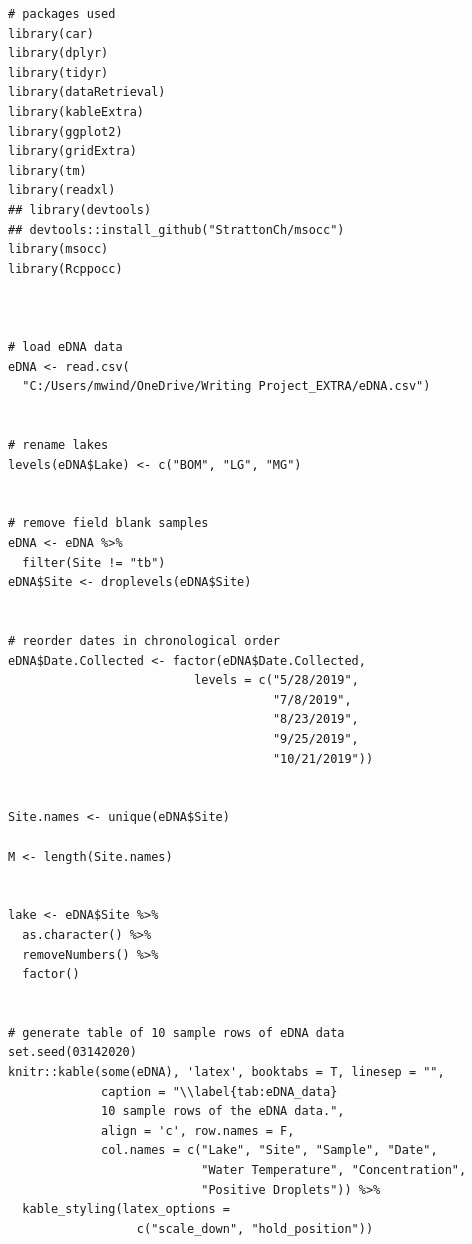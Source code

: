 \documentclass[12pt]{article}\usepackage[]{graphicx}\usepackage[]{color}
\makeatletter
\newenvironment{kframe}{%
 \def\at@end@of@kframe{}%
 \ifinner\ifhmode%
  \def\at@end@of@kframe{\end{minipage}}%
  \begin{minipage}{\columnwidth}%
 \fi\fi%
 \def\FrameCommand##1{\hskip\@totalleftmargin \hskip-\fboxsep
 \colorbox{shadecolor}{##1}\hskip-\fboxsep
     \hskip-\linewidth \hskip-\@totalleftmargin \hskip\columnwidth}%
 \MakeFramed {\advance\hsize-\width
   \@totalleftmargin\z@ \linewidth\hsize
   \@setminipage}}%
 {\par\unskip\endMakeFramed%
 \at@end@of@kframe}
\newenvironment{knitrout}{}{} %
\newenvironment{kframe}{%
 \def\at@end@of@kframe{}%
 \ifinner\ifhmode%
  \def\at@end@of@kframe{\end{minipage}}%
  \begin{minipage}{\columnwidth}%
 \fi\fi%
 \def\FrameCommand##1{\hskip\@totalleftmargin \hskip-\fboxsep
 \colorbox{shadecolor}{##1}\hskip-\fboxsep
     \hskip-\linewidth \hskip-\@totalleftmargin \hskip\columnwidth}%
 \MakeFramed {\advance\hsize-\width
   \@totalleftmargin\z@ \linewidth\hsize
   \@setminipage}}%
 {\par\unskip\endMakeFramed%
 \at@end@of@kframe}
\newenvironment{knitrout}{}{} %
\makeatother
\begin{document}
\begin{knitrout}
\color{fgcolor}\begin{kframe}
\begin{verbatim}
# packages used 
library(car)
library(dplyr)
library(tidyr)
library(dataRetrieval)
library(kableExtra)
library(ggplot2)
library(gridExtra)
library(tm)
library(readxl)
## library(devtools)
## devtools::install_github("StrattonCh/msocc")
library(msocc)
library(Rcppocc)



# load eDNA data
eDNA <- read.csv(
  "C:/Users/mwind/OneDrive/Writing Project_EXTRA/eDNA.csv")


# rename lakes
levels(eDNA$Lake) <- c("BOM", "LG", "MG")


# remove field blank samples
eDNA <- eDNA %>% 
  filter(Site != "tb")
eDNA$Site <- droplevels(eDNA$Site)


# reorder dates in chronological order
eDNA$Date.Collected <- factor(eDNA$Date.Collected,
                          levels = c("5/28/2019", 
                                     "7/8/2019", 
                                     "8/23/2019", 
                                     "9/25/2019",
                                     "10/21/2019"))


Site.names <- unique(eDNA$Site)

M <- length(Site.names)


lake <- eDNA$Site %>% 
  as.character() %>%
  removeNumbers() %>%
  factor()


# generate table of 10 sample rows of eDNA data
set.seed(03142020)
knitr::kable(some(eDNA), 'latex', booktabs = T, linesep = "",
             caption = "\\label{tab:eDNA_data}
             10 sample rows of the eDNA data.", 
             align = 'c', row.names = F, 
             col.names = c("Lake", "Site", "Sample", "Date", 
                           "Water Temperature", "Concentration", 
                           "Positive Droplets")) %>%
  kable_styling(latex_options = 
                  c("scale_down", "hold_position"))
\end{verbatim}
\end{kframe}
\end{knitrout}


\end{document}
